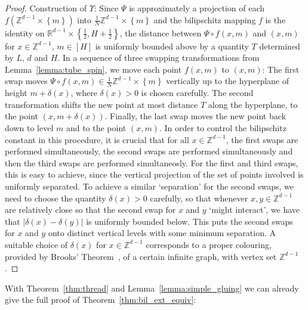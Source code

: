 \documentclass[a4paper, bibliography=totoc]{scrartcl}
\numberwithin{claimcounter}{define}
\newcommand{\R}{\mathbb{R}}
\newcommand{\Z}{\mathbb{Z}}
\newcommand{\abs}[1]{\left|#1\right|}
\newcommand{\set}[1]{\left\{#1\right\}}
\begin{document}
\begin{proof}
	Construction of $\Upsilon$: Since $\Psi$ is approximately a projection of each $f(\Z^{d-1}\times\set{m})$ into $\frac{1}{N}\Z^{d-1}\times\set{m}$ and the bilipschitz mapping $f$ is the identity on $\R^{d-1}\times\set{\frac{1}{2},H+\frac{1}{2}}$, the distance between $\Psi\circ f(x,m)$ and $(x,m)$ for $x\in\Z^{d-1}$, $m\in [H]$ is uniformly bounded above by a quantity $T$ determined by $L$, $d$ and $H$. In a sequence of three swapping transformations from Lemma~\ref{lemma:tube_spin}, we move each point $f(x,m)$ to $(x,m)$: The first swap moves $\Psi\circ f(x,m)\in \frac{1}{N}\Z^{d-1}\times\set{m}$ vertically up to the hyperplane of height $m+\delta(x)$, where $\delta(x)>0$ is chosen carefully. The second transformation shifts the new point at most distance $T$ along the hyperplane, to the point $(x,m+\delta(x))$. Finally, the last swap moves the new point back down to level $m$ and to the point $(x,m)$. In order to control the bilipschitz constant in this procedure, it is crucial that for all $x\in\Z^{d-1}$, the first swaps are performed simultaneously, the second swaps are performed simultaneously and then the third swaps are performed simultaneosly. For the first and third swaps, this is easy to achieve, since the vertical projection of the set of points involved is uniformly separated. To achieve a similar `separation' for the second swaps, we need to choose the quantity $\delta(x)>0$ carefully, so that whenever $x,y\in\Z^{d-1}$ are relatively close so that the second swap for $x$ and $y$ `might interact', we have that $\abs{\delta(x)-\delta(y)}$ is uniformly bounded below. This puts the second swaps for $x$ and $y$ onto distinct vertical levels with some minimum separation. A suitable choice of $\delta(x)$ for $x\in\Z^{d-1}$ corresponds to a proper colouring, provided by Brooks' Theorem~\cite{Brooks_1941}, of a certain infinite graph, with vertex set $\Z^{d-1}$.
\end{proof}

With Theorem~\ref{thm:thread} and Lemma~\ref{lemma:simple_gluing} we can already give the full proof of Theorem~\ref{thm:bil_ext_equiv}:
\end{document}
